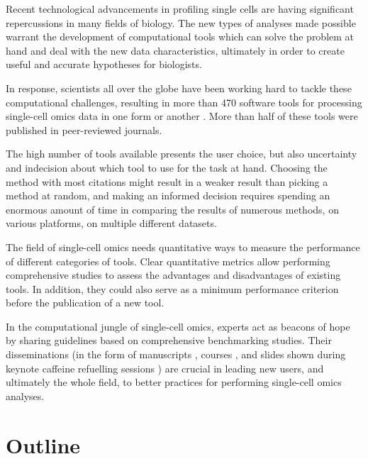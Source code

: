 Recent technological advancements in profiling single cells are having significant repercussions in many fields of biology. The new types of analyses made possible warrant the development of computational tools which can solve the problem at hand and deal with the new data characteristics, ultimately in order to create useful and accurate hypotheses for biologists.

In response, scientists all over the globe have been working hard to tackle these computational challenges, resulting in more than 470 software tools for processing single-cell omics data in one form or another \cite{zappia_exploringsinglecellrnaseq_2018}. More than half of these tools were published in peer-reviewed journals. 

The high number of tools available presents the user choice, but also uncertainty and indecision about which tool to use for the task at hand. Choosing the method with most citations might result in a weaker result than picking a method at random, and making an informed decision requires spending an enormous amount of time in comparing the results of numerous methods, on various platforms, on multiple different datasets. 

The field of single-cell omics needs quantitative ways to measure the performance of different categories of tools. Clear quantitative metrics allow performing comprehensive studies to assess the advantages and disadvantages of existing tools. In addition, they could also serve as a minimum performance criterion before the publication of a new tool.

In the computational jungle of single-cell omics, experts act as beacons of hope by sharing guidelines based on comprehensive benchmarking studies. Their disseminations (in the form of manuscripts \cite{lafzi_tutorialguidelinesexperimental_2018,luecken_currentbestpractices_2019}, courses \cite{kiselev_analysissinglecell_2019,martens_analysissinglecell_2019}, and slides shown during keynote caffeine refuelling sessions \cite{hemberg_coffeebreakanalysis_2019}) are crucial in leading new users, and ultimately the whole field, to better practices for performing single-cell omics analyses.


\section{Outline} %

